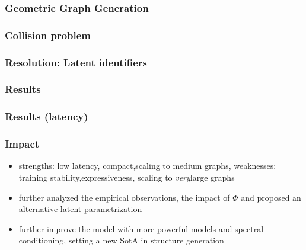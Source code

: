 \documentclass[./presentation.tex]{subfiles}
\begin{document}
\begin{frame}[label=working,t]
  \frametitle{Geometric Graph Generation}
  
\end{frame}


\begin{frame}[label=working,t]
  \frametitle{Collision problem}
  
\end{frame}
\begin{frame}[label=working,t]
  \frametitle{Resolution: Latent identifiers}
  
\end{frame}
\begin{frame}[label=working,t]
  \frametitle{Results}
  
\end{frame}
\begin{frame}[label=working,t]
  \frametitle{Results (latency)}
  
\end{frame}


\begin{frame}[label=working,t]
  \frametitle{Impact}
  \begin{itemize}
    \item strengths: low latency\checkmark, compact\checkmark,scaling to medium graphs\checkmark, weaknesses: training stability,expressiveness, scaling to \emph{very}large graphs
    \item \citep{vignacTopNEquivariantSet2021d} further analyzed the empirical observations, the impact of $\Phi$ and proposed an alternative latent parametrization
    \item \citep{martinkusSPECTRESpectralConditioning2022b} further improve the model with more powerful models and spectral conditioning, setting a new SotA in structure generation
  \end{itemize}
\end{frame}
\end{document}
